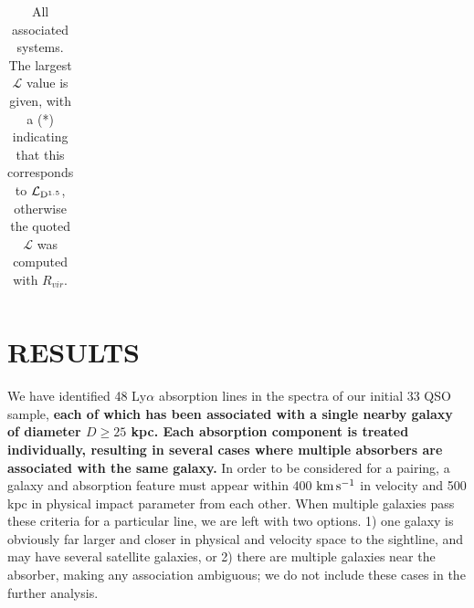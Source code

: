 \documentclass[twocolumn,tighten]{aastex6}
\begin{document}
\begin{table}[ht]
\begin{center}
\begin{tabular}{l l l l l l l l l l l l l l l}
 \\
\hline
\end{tabular}
\end{center}
  \caption{\small{All associated systems. The largest $\mathcal{L}$ value is given, with a (\**) indicating that this corresponds to $\mathcal{L}_{\rm D^{1.5}}$, otherwise the quoted $\mathcal{L}$ was computed with $R_{vir}$.}}
  \label{target_table}
\end{table}







\section{RESULTS}

We have identified 48 Ly$\alpha$ absorption lines in the spectra of our initial 33 QSO sample, \textbf{each of which has been associated with a single nearby galaxy of diameter $D\geq25$ kpc. Each absorption component is treated individually, resulting in several cases where multiple absorbers are associated with the same galaxy.} In order to be considered for a pairing, a galaxy and absorption feature must appear within 400 $\rm km\, s^{-1}$ in velocity and 500 kpc in physical impact parameter from each other. When multiple galaxies pass these criteria for a particular line, we are left with two options. 1) one galaxy is obviously far larger and closer in physical and velocity space to the sightline, and may have several satellite galaxies, or 2) there are multiple galaxies near the absorber, making any association ambiguous; we do not include these cases in the further analysis.
\end{document}
